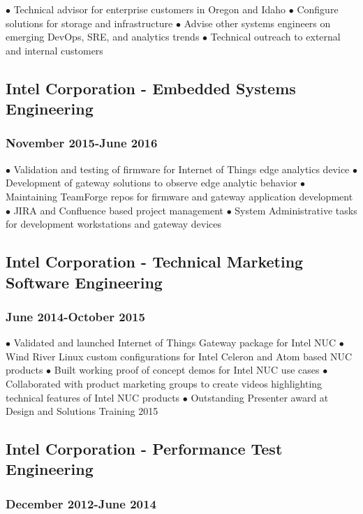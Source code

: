 \documentclass{article}
\begin{document}
$\bullet$ Technical advisor for enterprise customers in Oregon and Idaho
$\bullet$ Configure solutions for storage and infrastructure
$\bullet$ Advise other systems engineers on emerging DevOps, SRE, and analytics trends
$\bullet$ Technical outreach to external and internal customers

\subsection*{Intel Corporation - Embedded Systems Engineering}
\subsubsection*{November 2015-June 2016}

$\bullet$ Validation and testing of firmware for Internet of Things edge analytics device
$\bullet$ Development of gateway solutions to observe edge analytic behavior
$\bullet$ Maintaining TeamForge repos for firmware and gateway application development
$\bullet$ JIRA and Confluence based project management
$\bullet$ System Administrative tasks for development workstations and gateway devices


\subsection*{Intel Corporation - Technical Marketing Software Engineering}
\subsubsection*{June 2014-October 2015}

$\bullet$ Validated and launched Internet of Things Gateway package for Intel NUC
$\bullet$ Wind River Linux custom configurations for Intel Celeron and Atom based NUC products
$\bullet$ Built working proof of concept demos for Intel NUC use cases 
$\bullet$ Collaborated with product marketing groups to create videos highlighting technical features of Intel NUC products
$\bullet$ Outstanding Presenter award at Design and Solutions Training 2015  


\subsection*{Intel Corporation - Performance Test Engineering}
\subsubsection*{December 2012-June 2014}
\end{document}
